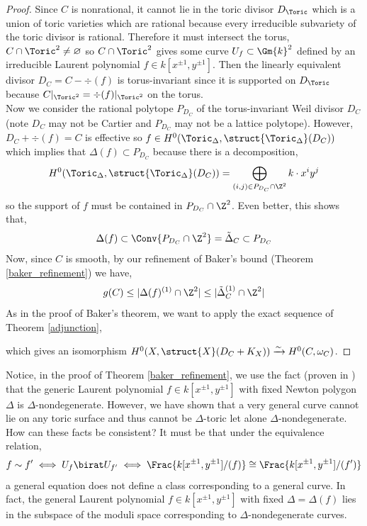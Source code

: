 \begin{proof}
Since $C$ is nonrational, it cannot lie in the toric divisor $D_\Toric$ which is a union of toric varieties which are rational because every irreducible subvariety of the toric divisor is rational. Therefore it must intersect the torus, $C \cap \Toric^2 \neq \varnothing$ so $C \cap \Toric^2$ gives some curve $U_f \subset \Gm{k}^2$ defined by an irreducible Laurent polynomial $f \in k[x^{\pm 1}, y^{\pm 1}]$. Then the linearly equivalent divisor $D_C = C - \div{(f)}$ is torus-invariant since it is supported on $D_\Toric$ because $C |_{\Toric^2} = \div{(f)} |_{\Toric^2}$ on the torus. 
\bigskip\\
Now we consider the rational polytope $P_{D_C}$ of the torus-invariant Weil divisor $D_C$ (note $D_C$ may not be Cartier and $P_{D_C}$ may not be a lattice polytope). However, $D_C + \div{(f)} = C$ is effective so $f \in H^0(\Toric_\Delta, \struct{\Toric_\Delta}(D_C))$ which implies that $\Delta(f) \subset P_{D_C}$ because there is a decomposition,
\[ H^0(\Toric_\Delta, \struct{\Toric_\Delta}(D_C)) = \bigoplus_{(i,j) \in P_{D_C} \cap \Z^2} k \cdot x^i y^j \]
so the support of $f$ must be contained in $P_{D_C} \cap \Z^2$. Even better, this shows that,
\[ \Delta(f) \subset \Conv{P_{D_C} \cap \Z^2} = \tilde{\Delta}_C \subset P_{D_C} \]
Now, since $C$ is smooth, by our refinement of Baker's bound (Theorem \ref{baker_refinement}) we have,
\[ g(C) \le |\Delta(f)^{(1)} \cap \Z^2| \le |\tilde{\Delta}_C^{(1)} \cap \Z^2 | \]
As in the proof of Baker's theorem, we want to apply the exact sequence of Theorem \ref{adjunction},
\begin{center}
\end{center}
which gives an isomorphism $H^0(X, \struct{X}(D_C + K_X)) \xrightarrow{\sim} H^0(C, \omega_C)$. 
\end{proof}

\begin{rmk}
Notice, in the proof of Theorem \ref{baker_refinement}, we use the fact (proven in \cite[Section 2, Prop. 1]{WC_zeta_functions}) that the generic Laurent polynomial $f \in k[x^{\pm 1}, y^{\pm 1}]$ with fixed Newton polygon $\Delta$ is $\Delta$-nondegenerate. However, we have shown that a very general curve cannot lie on any toric surface and thus cannot be $\Delta$-toric let alone $\Delta$-nondegenerate. How can these facts be consistent? It must be that under the equivalence relation,
\[ f \sim f' \iff U_f \birat U_{f'} \iff \Frac{k[x^{\pm 1},y^{\pm 1}]/(f)} \cong \Frac{k[x^{\pm 1},y^{\pm 1}] / (f')} \]
a general equation does not define a class corresponding to a general curve. In fact, the general Laurent polynomial $f \in k[x^{\pm 1}, y^{\pm 1}]$ with fixed $\Delta = \Delta(f)$ lies in the subspace of the moduli space corresponding to $\Delta$-nondegenerate curves.
\end{rmk}

